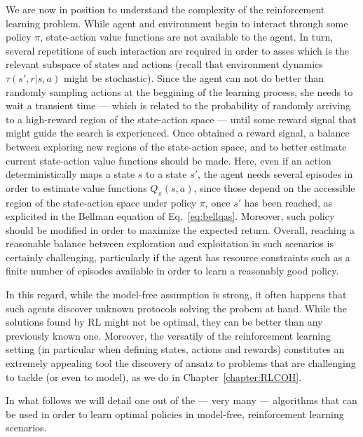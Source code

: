 We are now in position to understand the complexity of the reinforcement learning problem. While agent and environment begin to interact through some policy $\pi$, state-action value functions are not available to the agent. In turn, several repetitions of such interaction are required in order to  asses which is the relevant subspace of states and actions (recall that environment dynamics $\tau(s',r|s,a)$ might be stochastic). Since the agent can not do better than randomly sampling actions at the beggining of the learning process, she needs to wait a transient time --- which is related to the probability of randomly arriving to a high-reward region of the state-action space --- until some reward signal that might guide the search is experienced. Once obtained a reward signal, a balance between exploring new regions of the state-action space, and to better estimate current state-action value functions should be made. Here, even if an action deterministically maps a state $s$ to a state $s'$, the agent needs several episodes in order to estimate value functions $Q_\pi(s,a)$, since those depend on the accessible region of the state-action space under policy $\pi$, once $s'$ has been reached, as explicited in the Bellman equation of Eq.~\ref{eq:bellqas}. Moreover, such policy should be modified in order to maximize the expected return. Overall, reaching a reasonable balance between exploration and exploitation in such scenarios is certainly challenging, particularly if the agent has resource constraints such as a finite number of episodes available in order to learn a reasonably good policy.

In this regard, while the model-free assumption is strong, it often happens that such agents discover unknown protocols solving the probem at hand. While the solutions found by RL might not be optimal, they can be better than any previously known one. Moreover, the versatily of the reinforcement learning setting (in particular when defining states, actions and rewards) constitutes an extremely appealing tool the discovery of ansatz to problems that are challenging to tackle (or even to model), as we do in Chapter~\ref{chapter:RLCOH}.

In what follows we will detail one out of the --- very many --- algorithms that can be used in order to learn optimal policies in model-free, reinforcement learning scenarios.

%
